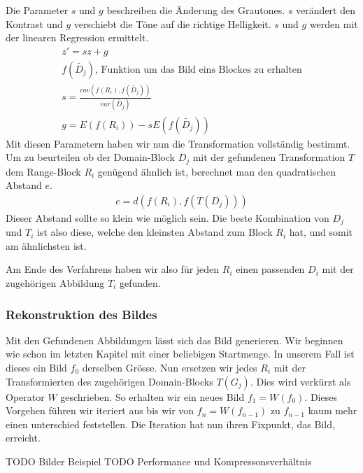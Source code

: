 Die Parameter $s$ und $g$ beschreiben die Änderung des Grautones. $s$ verändert den Kontrast und $g$ verschiebt die Töne auf die richtige Helligkeit. 
$s$ und $g$ werden mit der linearen Regression ermittelt. 
\begin{align*}
	z' = sz + g \\
	f(\tilde{D_j}) \text{, Funktion um das Bild eins Blockes zu erhalten}  \\
	s = \frac{cov(f(R_i), f(\tilde{D_j}))}{var(\tilde{D_j})} \\
	g = E(f(R_i)) - s E(f(\tilde{D_j}))
\end{align*}
Mit diesen Parametern haben wir nun die Transformation vollständig bestimmt.
Um zu beurteilen ob der Domain-Block $D_j$ mit der gefundenen Transformation $T$ dem Range-Block $R_i$ genügend ähnlich ist, berechnet man den quadratischen Abstand $e$.
\begin{align*}
	e = d(f(R_i), f(T(D_j)))
\end{align*}
Dieser Abstand sollte so klein wie möglich sein.
Die beste Kombination von $D_j$ und $T_i$ ist also diese, welche den kleinsten Abstand zum Block $R_i$ hat, und somit am ähnlichsten ist.

Am Ende des Verfahrens haben wir also für jeden $R_i$ einen passenden $D_i$ mit der zugehörigen Abbildung $T_i$ gefunden.

\subsubsection{Rekonstruktion des Bildes}
Mit den Gefundenen Abbildungen lässt sich das Bild generieren.
Wir beginnen wie schon im letzten Kapitel mit einer beliebigen Startmenge.
In unserem Fall ist dieses ein Bild  $f_0$ derselben Grösse.
Nun ersetzen wir jedes $R_i$ mit der Transformierten des zugehörigen Domain-Blocks $T(G_j)$.
Dies wird verkürzt als Operator $W$ geschrieben.
So erhalten wir ein neues Bild $f_1 = W(f_0)$.
Dieses Vorgehen führen wir iteriert aus bis wir von $f_n = W(f_{n-1})$ zu $f_{n-1}$ kaum mehr einen unterschied feststellen. Die Iteration hat nun ihren Fixpunkt, das Bild, erreicht.

TODO Bilder Beispiel
TODO Performance und Kompressonsverhältnis
